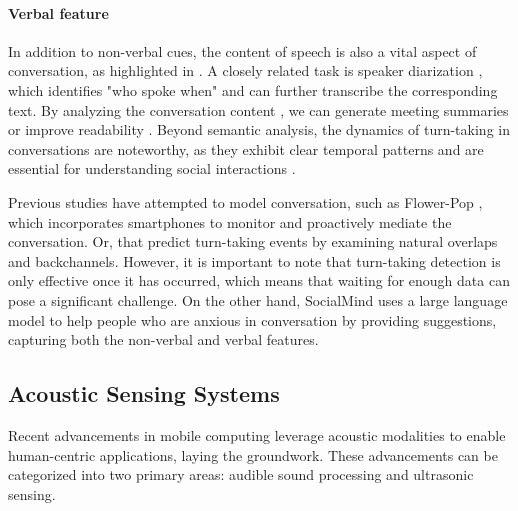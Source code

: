 \paragraph{Verbal feature}
In addition to non-verbal cues, the content of speech is also a vital aspect of conversation, as highlighted in \cite{sacks1974simplest}. A closely related task is speaker diarization \cite{bredin2023pyannote}, which identifies "who spoke when" and can further transcribe the corresponding text. By analyzing the conversation content \cite{wei2022conversational}, we can generate meeting summaries \cite{ramprasad2024analyzing} or improve readability \cite{wang2024diarizationlm}. Beyond semantic analysis, the dynamics of turn-taking in conversations are noteworthy, as they exhibit clear temporal patterns and are essential for understanding social interactions \cite{levinson2015timing}. 

Previous studies have attempted to model conversation, such as Flower-Pop \cite{lee2018flower}, which incorporates smartphones to monitor and proactively mediate the conversation. Or, \cite{chen2024target, chang2022turn} that predict turn-taking events by examining natural overlaps and backchannels. However, it is important to note that turn-taking detection is only effective once it has occurred, which means that waiting for enough data can pose a significant challenge. On the other hand, SocialMind \cite{yang2025socialmind} uses a large language model to help people who are anxious in conversation by providing suggestions, capturing both the non-verbal and verbal features. 



\subsection{Acoustic Sensing Systems}
Recent advancements in mobile computing leverage acoustic modalities to enable human-centric applications, laying the groundwork. These advancements can be categorized into two primary areas: audible sound processing and ultrasonic sensing.

